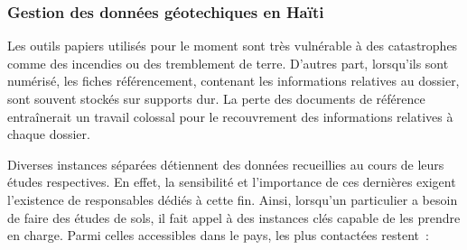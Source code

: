         \subsubsection{Gestion des données géotechiques en Haïti}
            \par
            Les outils papiers utilisés pour le moment sont très vulnérable à des
            catastrophes comme des incendies ou des tremblement de terre. D'autres
            part, lorsqu'ils sont numérisé, les fiches référencement, contenant les
            informations relatives au dossier, sont souvent stockés sur supports
            dur. La perte des documents de référence entraînerait un travail
            colossal pour le recouvrement des informations relatives à chaque 
            dossier.
            \par
            Diverses instances séparées détiennent des données recueillies au cours
            de leurs études respectives. En effet, la sensibilité et l’importance de
            ces dernières exigent l’existence de responsables dédiés à cette fin. 
            Ainsi, lorsqu’un particulier a besoin de faire des études de sols, il 
            fait appel à des instances clés capable de les prendre en charge. 
            Parmi celles accessibles dans le pays, les plus contactées restent :
